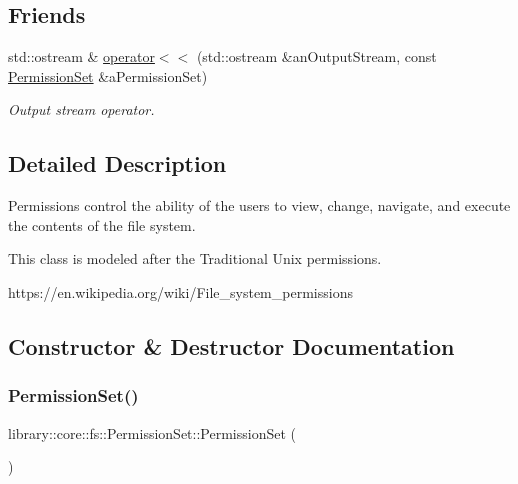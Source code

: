 \subsection*{Friends}
\begin{DoxyCompactItemize}
\item 
std\+::ostream \& \hyperlink{classlibrary_1_1core_1_1fs_1_1_permission_set_a8f2d68bb94d86dea76869abe148ea9f3}{operator$<$$<$} (std\+::ostream \&an\+Output\+Stream, const \hyperlink{classlibrary_1_1core_1_1fs_1_1_permission_set}{Permission\+Set} \&a\+Permission\+Set)
\begin{DoxyCompactList}\small\item\em Output stream operator. \end{DoxyCompactList}\end{DoxyCompactItemize}


\subsection{Detailed Description}
Permissions control the ability of the users to view, change, navigate, and execute the contents of the file system. 

This class is modeled after the Traditional Unix permissions.

https\+://en.wikipedia.\+org/wiki/\+File\+\_\+system\+\_\+permissions 

\subsection{Constructor \& Destructor Documentation}
\mbox{\label{classlibrary_1_1core_1_1fs_1_1_permission_set_a8a6eb39cc2a8bca92a657d065d3e36ba}} 
\subsubsection{\texorpdfstring{Permission\+Set()}{PermissionSet()}\hspace{0.1cm}{\footnotesize\ttfamily [1/2]}}
{\footnotesize\ttfamily library\+::core\+::fs\+::\+Permission\+Set\+::\+Permission\+Set (\begin{DoxyParamCaption}{ }\end{DoxyParamCaption})\hspace{0.3cm}{\ttfamily [delete]}}



